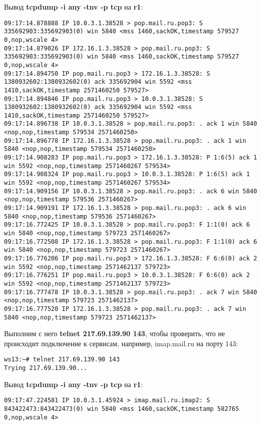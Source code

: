 \documentclass[a4paper,12pt]{article}
\begin{document}
Вывод \textbf{tcpdump -i any -tnv -p tcp} на \textbf{r1}:
\begin{Verbatim}
09:17:14.878888 IP 10.0.3.1.38528 > pop.mail.ru.pop3: S 335692903:335692903(0) win 5840 <mss 1460,sackOK,timestamp 579527 0,nop,wscale 4>
09:17:14.879026 IP 172.16.1.3.38528 > pop.mail.ru.pop3: S 335692903:335692903(0) win 5840 <mss 1460,sackOK,timestamp 579527 0,nop,wscale 4>
09:17:14.894750 IP pop.mail.ru.pop3 > 172.16.1.3.38528: S 1380932602:1380932602(0) ack 335692904 win 5592 <mss 1410,sackOK,timestamp 2571460250 579527>
09:17:14.894846 IP pop.mail.ru.pop3 > 10.0.3.1.38528: S 1380932602:1380932602(0) ack 335692904 win 5592 <mss 1410,sackOK,timestamp 2571460250 579527>
09:17:14.896738 IP 10.0.3.1.38528 > pop.mail.ru.pop3: . ack 1 win 5840 <nop,nop,timestamp 579534 2571460250>
09:17:14.896778 IP 172.16.1.3.38528 > pop.mail.ru.pop3: . ack 1 win 5840 <nop,nop,timestamp 579534 2571460250>
09:17:14.908283 IP pop.mail.ru.pop3 > 172.16.1.3.38528: P 1:6(5) ack 1 win 5592 <nop,nop,timestamp 2571460267 579534>
09:17:14.908324 IP pop.mail.ru.pop3 > 10.0.3.1.38528: P 1:6(5) ack 1 win 5592 <nop,nop,timestamp 2571460267 579534>
09:17:14.909156 IP 10.0.3.1.38528 > pop.mail.ru.pop3: . ack 6 win 5840 <nop,nop,timestamp 579536 2571460267>
09:17:14.909191 IP 172.16.1.3.38528 > pop.mail.ru.pop3: . ack 6 win 5840 <nop,nop,timestamp 579536 2571460267>
09:17:16.772425 IP 10.0.3.1.38528 > pop.mail.ru.pop3: F 1:1(0) ack 6 win 5840 <nop,nop,timestamp 579723 2571460267>
09:17:16.772508 IP 172.16.1.3.38528 > pop.mail.ru.pop3: F 1:1(0) ack 6 win 5840 <nop,nop,timestamp 579723 2571460267>
09:17:16.776206 IP pop.mail.ru.pop3 > 172.16.1.3.38528: F 6:6(0) ack 2 win 5592 <nop,nop,timestamp 2571462137 579723>
09:17:16.776251 IP pop.mail.ru.pop3 > 10.0.3.1.38528: F 6:6(0) ack 2 win 5592 <nop,nop,timestamp 2571462137 579723>
09:17:16.777478 IP 10.0.3.1.38528 > pop.mail.ru.pop3: . ack 7 win 5840 <nop,nop,timestamp 579723 2571462137>
09:17:16.777520 IP 172.16.1.3.38528 > pop.mail.ru.pop3: . ack 7 win 5840 <nop,nop,timestamp 579723 2571462137>
\end{Verbatim}

Выполним с него \textbf{telnet 217.69.139.90 143},  чтобы проверить, что не
происходит подключение к сервисам, например, imap.mail.ru на порту 143:
\begin{Verbatim}
ws13:~# telnet 217.69.139.90 143
Trying 217.69.139.90...
\end{Verbatim}

Вывод \textbf{tcpdump -i any -tnv -p tcp} на \textbf{r1}:
\begin{Verbatim}
09:17:47.224581 IP 10.0.3.1.45924 > imap.mail.ru.imap2: S 843422473:843422473(0) win 5840 <mss 1460,sackOK,timestamp 582765 0,nop,wscale 4>
\end{Verbatim}
\end{document}
